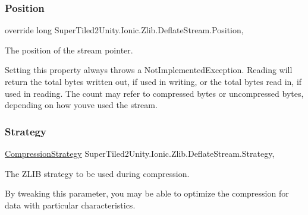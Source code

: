 \subsubsection{\texorpdfstring{Position}{Position}}
{\footnotesize\ttfamily override long Super\+Tiled2\+Unity.\+Ionic.\+Zlib.\+Deflate\+Stream.\+Position\hspace{0.3cm}{\ttfamily [get]}, {\ttfamily [set]}}



The position of the stream pointer. 

Setting this property always throws a Not\+Implemented\+Exception. Reading will return the total bytes written out, if used in writing, or the total bytes read in, if used in reading. The count may refer to compressed bytes or uncompressed bytes, depending on how you\textquotesingle{}ve used the stream. \mbox{\label{class_super_tiled2_unity_1_1_ionic_1_1_zlib_1_1_deflate_stream_a55241fe0bc77986941f432d1c53aa420}} 
\subsubsection{\texorpdfstring{Strategy}{Strategy}}
{\footnotesize\ttfamily \mbox{\hyperlink{namespace_super_tiled2_unity_1_1_ionic_1_1_zlib_abde5c10a1e2ee453e1e8e22e79a39a3b}{Compression\+Strategy}} Super\+Tiled2\+Unity.\+Ionic.\+Zlib.\+Deflate\+Stream.\+Strategy\hspace{0.3cm}{\ttfamily [get]}, {\ttfamily [set]}}



The Z\+L\+IB strategy to be used during compression. 

By tweaking this parameter, you may be able to optimize the compression for data with particular characteristics. \mbox{\label{class_super_tiled2_unity_1_1_ionic_1_1_zlib_1_1_deflate_stream_a4950384f71050fc0dfbc53e30880e660}} 
